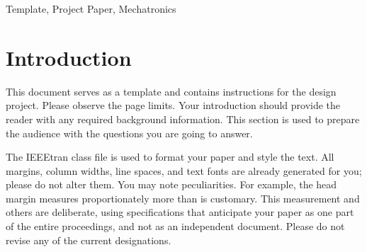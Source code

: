 \begin{abstract}
This document is to be used as a template model for your design project report. Included in the .tex file are comments and instructions on how the document is constructed. Please check the \LaTeX documentation available online for additional information. For your design report, the abstract should contain a concise summary of the document.
\end{abstract}

\begin{IEEEkeywords}
Template, Project Paper, Mechatronics
\end{IEEEkeywords}











\section{Introduction}
This document serves as a template and contains instructions for the design project. Please observe the page limits. Your introduction should provide the reader with any required background information. This section is used to prepare the audience with the questions you are going to answer.


The IEEEtran class file is used to format your paper and style the text. All margins, column widths, line spaces, and text fonts are already generated for you; please do not alter them. You may note peculiarities. For example, the head margin measures proportionately more than is customary. This measurement and others are deliberate, using specifications that anticipate your paper as one part of the entire proceedings, and not as an independent document. Please do not revise any of the current designations.









